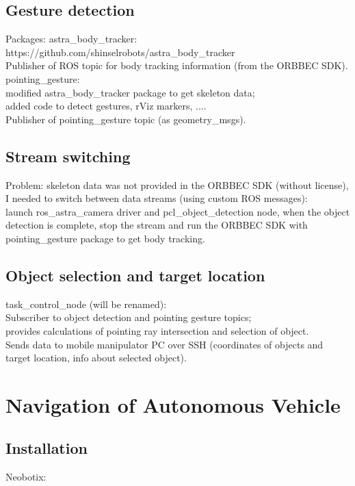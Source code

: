 \subsection{Gesture detection}
Packages: 
astra\_body\_tracker:\\
https://github.com/shinselrobots/astra\_body\_tracker\\
Publisher of ROS topic for body tracking information (from the ORBBEC SDK).\\

pointing\_gesture:\\
modified astra\_body\_tracker package to get skeleton data;\\
added code to detect gestures, rViz markers, ....\\

Publisher of pointing\_gesture topic (as geometry\_msgs).\\

\subsection{Stream switching}
Problem: skeleton data was not provided in the ORBBEC SDK (without license), I needed to switch between data streams (using custom ROS messages):\\
launch ros\_astra\_camera driver and pcl\_object\_detection node, when the object detection is complete, stop the stream and run the ORBBEC SDK with pointing\_gesture package to get body tracking.

\subsection{Object selection and target location}
task\_control\_node (will be renamed):\\
Subscriber to object detection and pointing gesture topics;\\
provides calculations of pointing ray intersection and selection of object.\\
Sends data to mobile manipulator PC over SSH (coordinates of objects and target location, info about selected object).\\


\section{Navigation of Autonomous Vehicle}

\subsection{Installation}
Neobotix:

